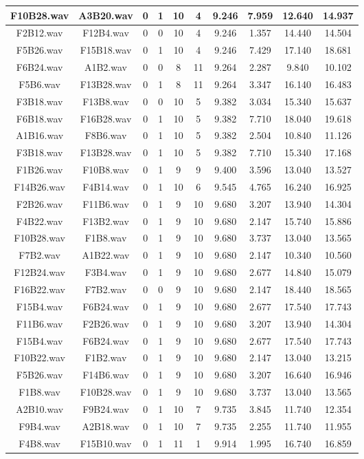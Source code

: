 \documentclass[11pt,a4paper]{book}
\begin{document}
\begin{longtable}[c]{|c|c|c|c|c|c|c|c|c|c|}
F10B28.wav&A3B20.wav&0&1&10&4&9.246&7.959&12.640&14.937\\ \hline
F2B12.wav&F12B4.wav&0&0&10&4&9.246&1.357&14.440&14.504\\ \hline
F5B26.wav&F15B18.wav&0&1&10&4&9.246&7.429&17.140&18.681\\ \hline
F6B24.wav&A1B2.wav&0&0&8&11&9.264&2.287&9.840&10.102\\ \hline
F5B6.wav&F13B28.wav&0&1&8&11&9.264&3.347&16.140&16.483\\ \hline
F3B18.wav&F13B8.wav&0&0&10&5&9.382&3.034&15.340&15.637\\ \hline
F6B18.wav&F16B28.wav&0&1&10&5&9.382&7.710&18.040&19.618\\ \hline
A1B16.wav&F8B6.wav&0&1&10&5&9.382&2.504&10.840&11.126\\ \hline
F3B18.wav&F13B28.wav&0&1&10&5&9.382&7.710&15.340&17.168\\ \hline
F1B26.wav&F10B8.wav&0&1&9&9&9.400&3.596&13.040&13.527\\ \hline
F14B26.wav&F4B14.wav&0&1&10&6&9.545&4.765&16.240&16.925\\ \hline
F2B26.wav&F11B6.wav&0&1&9&10&9.680&3.207&13.940&14.304\\ \hline
F4B22.wav&F13B2.wav&0&1&9&10&9.680&2.147&15.740&15.886\\ \hline
F10B28.wav&F1B8.wav&0&1&9&10&9.680&3.737&13.040&13.565\\ \hline
F7B2.wav&A1B22.wav&0&1&9&10&9.680&2.147&10.340&10.560\\ \hline
F12B24.wav&F3B4.wav&0&1&9&10&9.680&2.677&14.840&15.079\\ \hline
F16B22.wav&F7B2.wav&0&0&9&10&9.680&2.147&18.440&18.565\\ \hline
F15B4.wav&F6B24.wav&0&1&9&10&9.680&2.677&17.540&17.743\\ \hline
F11B6.wav&F2B26.wav&0&1&9&10&9.680&3.207&13.940&14.304\\ \hline
F15B4.wav&F6B24.wav&0&1&9&10&9.680&2.677&17.540&17.743\\ \hline
F10B22.wav&F1B2.wav&0&1&9&10&9.680&2.147&13.040&13.215\\ \hline
F5B26.wav&F14B6.wav&0&1&9&10&9.680&3.207&16.640&16.946\\ \hline
F1B8.wav&F10B28.wav&0&1&9&10&9.680&3.737&13.040&13.565\\ \hline
A2B10.wav&F9B24.wav&0&1&10&7&9.735&3.845&11.740&12.354\\ \hline
F9B4.wav&A2B18.wav&0&1&10&7&9.735&2.255&11.740&11.955\\ \hline
F4B8.wav&F15B10.wav&0&1&11&1&9.914&1.995&16.740&16.859\\ \hline

\end{longtable}
\end{document}
